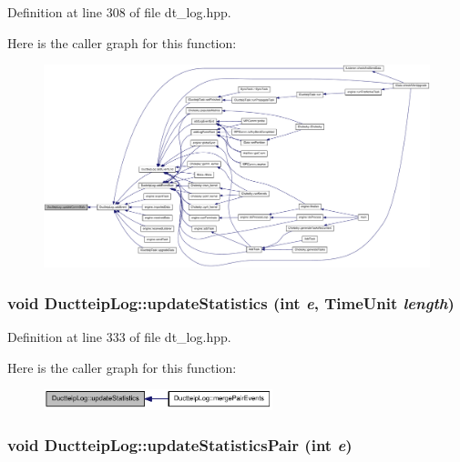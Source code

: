 Definition at line 308 of file dt\_\-log.hpp.

Here is the caller graph for this function:\nopagebreak
\begin{figure}[H]
\begin{center}
\leavevmode
\includegraphics[width=420pt]{class_ductteip_log_a3f2679d12c317c14c06ac0a23243cb6a_icgraph}
\end{center}
\end{figure}
\hypertarget{class_ductteip_log_a8c685fe96e233dfc3f2be278cdc6d340}{
\subsubsection[{updateStatistics}]{\setlength{\rightskip}{0pt plus 5cm}void DuctteipLog::updateStatistics (int {\em e}, \/  {\bf TimeUnit} {\em length})}}
\label{class_ductteip_log_a8c685fe96e233dfc3f2be278cdc6d340}


Definition at line 333 of file dt\_\-log.hpp.

Here is the caller graph for this function:\nopagebreak
\begin{figure}[H]
\begin{center}
\leavevmode
\includegraphics[width=188pt]{class_ductteip_log_a8c685fe96e233dfc3f2be278cdc6d340_icgraph}
\end{center}
\end{figure}
\hypertarget{class_ductteip_log_a10e6b8ed2cea31010e9937b5d0f5e685}{
\subsubsection[{updateStatisticsPair}]{\setlength{\rightskip}{0pt plus 5cm}void DuctteipLog::updateStatisticsPair (int {\em e})}}
\label{class_ductteip_log_a10e6b8ed2cea31010e9937b5d0f5e685}


